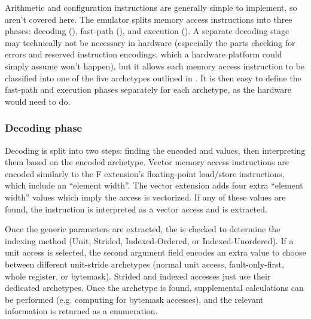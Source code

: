 Arithmetic and configuration instructions are generally simple to implement, so aren't covered here.
The emulator splits memory access instructions into three phases: decoding (\todoref{}), fast-path (\todoref{}), and execution (\todoref{}).
A separate decoding stage may technically not be necessary in hardware (especially the parts checking for errors and reserved instruction encodings, which a hardware platform could simply assume won't happen), but it allows each memory access instruction to be classified into one of the five archetypes outlined in .
It is then easy to define the fast-path and execution phases separately for each archetype, as the hardware would need to do.

\subsubsection{Decoding phase}
Decoding is split into two steps: finding the encoded  and  values, then interpreting them based on the encoded archetype.
Vector memory access instructions are encoded similarly to the F extension's floating-point load/store instructions, which include an ``element width''.
The vector extension adds four extra ``element width'' values which imply the access is vectorized.
If any of these values are found, the instruction is interpreted as a vector access and  is extracted.

Once the generic parameters are extracted, the  is checked to determine the indexing method (Unit, Strided, Indexed-Ordered, or Indexed-Unordered).
If a unit access is selected, the second argument field encodes an extra value to choose between different unit-stride archetypes (normal unit access, fault-only-first, whole register, or bytemask).
Strided and indexed accesses just use their dedicated archetypes.
Once the archetype is found, supplemental calculations can be performed (e.g. computing  for bytemask accesses), and the relevant information is returned as a  enumeration.


